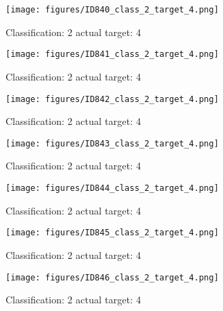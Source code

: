 \begin{figure}[h!]
\begin{center}
\texttt{[image: figures/ID840\_class\_2\_target\_4.png]}
\end{center}
\caption{ Classification: 2 actual target: 4}
\label{fig:ID840_class_2_target_4}
\end{figure}
\begin{figure}[h!]
\begin{center}
\texttt{[image: figures/ID841\_class\_2\_target\_4.png]}
\end{center}
\caption{ Classification: 2 actual target: 4}
\label{fig:ID841_class_2_target_4}
\end{figure}
\begin{figure}[h!]
\begin{center}
\texttt{[image: figures/ID842\_class\_2\_target\_4.png]}
\end{center}
\caption{ Classification: 2 actual target: 4}
\label{fig:ID842_class_2_target_4}
\end{figure}
\begin{figure}[h!]
\begin{center}
\texttt{[image: figures/ID843\_class\_2\_target\_4.png]}
\end{center}
\caption{ Classification: 2 actual target: 4}
\label{fig:ID843_class_2_target_4}
\end{figure}
\begin{figure}[h!]
\begin{center}
\texttt{[image: figures/ID844\_class\_2\_target\_4.png]}
\end{center}
\caption{ Classification: 2 actual target: 4}
\label{fig:ID844_class_2_target_4}
\end{figure}
\begin{figure}[h!]
\begin{center}
\texttt{[image: figures/ID845\_class\_2\_target\_4.png]}
\end{center}
\caption{ Classification: 2 actual target: 4}
\label{fig:ID845_class_2_target_4}
\end{figure}
\begin{figure}[h!]
\begin{center}
\texttt{[image: figures/ID846\_class\_2\_target\_4.png]}
\end{center}
\caption{ Classification: 2 actual target: 4}
\label{fig:ID846_class_2_target_4}
\end{figure}
